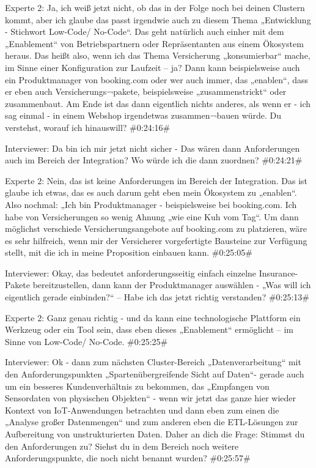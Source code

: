 Experte 2:
Ja, ich weiß jetzt nicht, ob das in der Folge noch bei deinen Clustern kommt, aber ich glaube das passt irgendwie auch zu diesem Thema „Entwicklung - Stichwort Low-Code/ No-Code“. Das geht natürlich auch einher mit dem „Enablement“ von Betriebspartnern oder Repräsentanten aus einem Ökosystem heraus. Das heißt also, wenn ich das Thema Versicherung „konsumierbar“ mache, im Sinne einer Konfiguration zur Laufzeit – ja? Dann kann beispielsweise auch ein Produktmanager von booking.com oder wer auch immer, das „enablen“, dass er eben auch Versicherungs¬pakete, beispielsweise „zusammenstrickt“ oder zusammenbaut. Am Ende ist das dann eigentlich nichts anderes, als wenn er - ich sag einmal - in einem Webshop irgendetwas zusammen¬bauen würde. Du verstehst, worauf ich hinauswill? 
\#0:24:16\#

Interviewer:
Da bin ich mir jetzt nicht sicher - Das wären dann Anforderungen auch im Bereich der Integration? Wo würde ich die dann zuordnen?
\#0:24:21\#

Experte 2:
Nein, das ist keine Anforderungen im Bereich der Integration. Das ist glaube ich etwas, das es auch darum geht eben mein Ökosystem zu „enablen“. Also nochmal: „Ich bin Produktmanager - beispielsweise bei booking.com. Ich habe von Versicherungen so wenig Ahnung „wie eine Kuh vom Tag“. Um dann möglichst verschiede Versicherungsangebote auf booking.com zu platzieren, wäre es sehr hilfreich, wenn mir der Versicherer vorgefertigte Bausteine zur Verfügung stellt, mit die ich in meine Proposition einbauen kann. 
\#0:25:05\#

Interviewer:
Okay, das bedeutet anforderungsseitig einfach einzelne Insurance-Pakete bereitzustellen, dann kann der Produktmanager auswählen - „Was will ich eigentlich gerade einbinden?“ – Habe ich das jetzt richtig verstanden?
\#0:25:13\#

Experte 2:
Ganz genau richtig - und da kann eine technologische Plattform ein Werkzeug oder ein Tool sein, dass eben dieses „Enablement“ ermöglicht – im Sinne von Low-Code/ No-Code.
\#0:25:25\#

Interviewer:
Ok - dann zum nächsten Cluster-Bereich „Datenverarbeitung“ mit den Anforderungspunkten „Spartenübergreifende Sicht auf Daten“- gerade auch um ein besseres Kundenverhältnis zu bekommen, das „Empfangen von Sensordaten von physischen Objekten“ - wenn wir jetzt das ganze hier wieder Kontext von IoT-Anwendungen betrachten und dann eben zum einen die „Analyse großer Datenmengen“ und zum anderen eben die ETL-Lösungen zur Aufbereitung von unstrukturierten Daten. Daher an dich die Frage: Stimmst du den Anforderungen zu? Siehst du in dem Bereich noch weitere Anforderungspunkte, die noch nicht benannt wurden?
\#0:25:57\#

